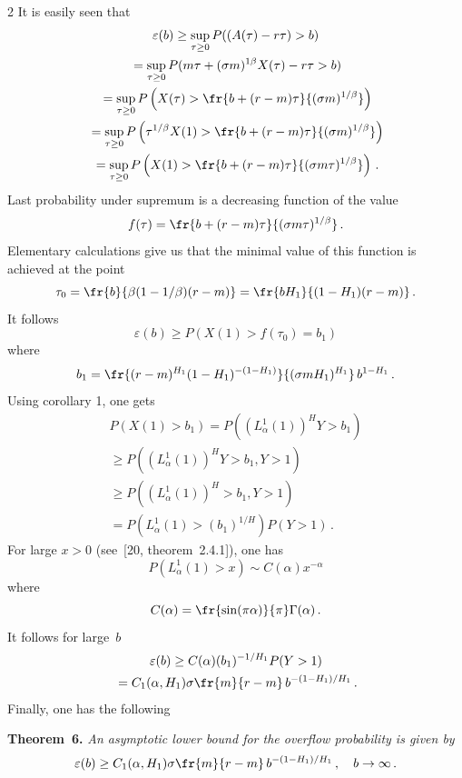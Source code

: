 \begin{multicols}{2}
It is easily seen that 
\begin{multline*}
\varepsilon (b) \geq 
\sup\limits_{\tau\geq 0} P( (A(\tau ) - r\tau ) > b ) \\
{}=
\sup\limits_{\tau\geq 0} P( m\tau +(\sigma m )^{1\/\beta} X(\tau ) - r\tau  > b )\\
{}=
\sup\limits_{\tau\geq 0} P\left( X(\tau ) > 
\fr{b+(r-m)\tau}{(\sigma m)^{1/\beta}}\right ) \\
{}=
\sup\limits_{\tau\geq 0} P\left( \tau^{1/\beta} X(1) > 
\fr{b+(r-m)\tau}{(\sigma m)^{1/\beta}}\right ) \\
{}=
\sup\limits_{\tau\geq 0} P\left( X(1) > 
\fr{b+(r-m)\tau}{(\sigma m \tau )^{1/\beta}}\right ) \,. 
\end{multline*}
Last probability under supremum is a decreasing function of the value 
$$
f(\tau ) = \fr{b+(r-m)\tau}{(\sigma m \tau )^{1/\beta}}\,.
$$
Elementary calculations give us that the minimal value of this function is achieved at the 
point 
$$
\tau_0 = \fr{b}{\beta (1-1/\beta )(r-m)} = \fr{b H_1}{(1-H_1 ) (r-m)} \,. 
$$
It follows 
$$
\varepsilon (b) \geq P(X(1) > f(\tau_0 ) = b_1 ) 
$$ 
where 
$$
b_1 = \fr{(r-m)^{H_1} (1-H_1 )^{-(1-H_1 )} }{(\sigma m H_1 )^{H_1 } } \, b^{1-H_1} \,. 
$$
Using corollary 1, one gets 
\begin{multline*}
P(X(1) > b_1 ) = P((L_{\alpha}^1 (1))^H Y >b_1 ) \\
{}\geq  
P((L_{\alpha}^1 (1))^H Y >b_1 , Y>1) \\
{}\geq
P((L_{\alpha}^1 (1))^H >b_1 , Y>1)\\ = P(L_{\alpha}^1 (1) 
>(b_1 )^{1/H} ) P(Y>1) \,. 
\end{multline*}
For large $x>0$ (see~[20, theorem~2.4.1]), one has 
$$
 P(L_{\alpha}^1 (1) > x ) \sim C(\alpha ) x^{-\alpha} 
$$
where 
$$
C(\alpha ) = \fr{\sin (\pi\alpha )}{\pi} \Gamma (\alpha )\,.
$$
It follows for large~$b$ 
\begin{multline*}
\varepsilon (b) \geq C(\alpha ) (b_1 )^{-1/H_1} P(Y>1)\\
{}=
C_1 (\alpha , H_1 )\sigma \fr{m}{r-m} \, b^{-({1-H_1})/H_1} \,.
\end{multline*}
Finally, one has the following 

\pagebreak

\smallskip

\noindent
\textbf{Theorem~6.} \textit{An asymptotic lower bound for the overflow probability is given by}
$$
\varepsilon (b) \geq
C_1 (\alpha , H_1 )\sigma \fr{m}{r-m} \, b^{-({1-H_1})/{H_1} } \,, \quad
b\to\infty \,.
$$


\end{multicols}

